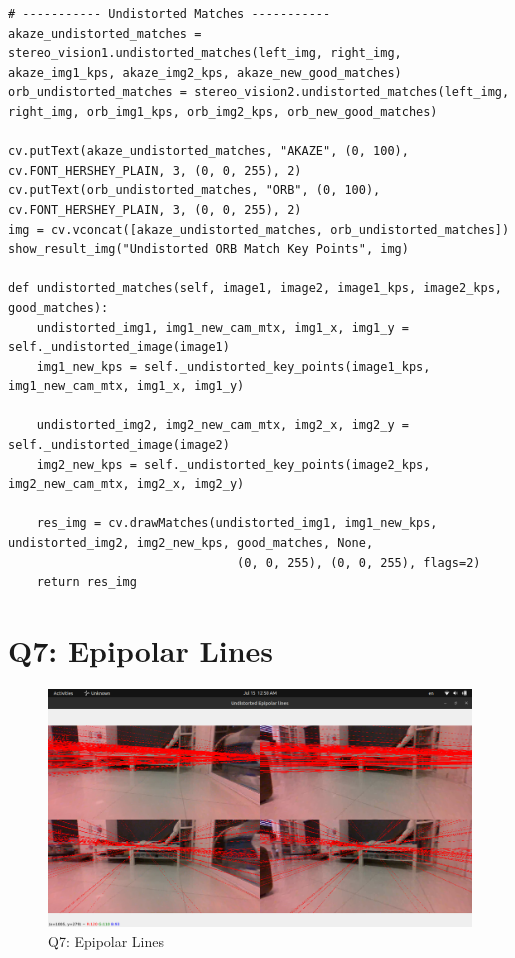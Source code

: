 \documentclass[a4paper, 12pt]{article}
\begin{document}
    \begin{lstlisting}
# ----------- Undistorted Matches -----------
akaze_undistorted_matches = stereo_vision1.undistorted_matches(left_img, right_img, akaze_img1_kps, akaze_img2_kps, akaze_new_good_matches)
orb_undistorted_matches = stereo_vision2.undistorted_matches(left_img, right_img, orb_img1_kps, orb_img2_kps, orb_new_good_matches)

cv.putText(akaze_undistorted_matches, "AKAZE", (0, 100), cv.FONT_HERSHEY_PLAIN, 3, (0, 0, 255), 2)
cv.putText(orb_undistorted_matches, "ORB", (0, 100), cv.FONT_HERSHEY_PLAIN, 3, (0, 0, 255), 2)
img = cv.vconcat([akaze_undistorted_matches, orb_undistorted_matches])
show_result_img("Undistorted ORB Match Key Points", img)

def undistorted_matches(self, image1, image2, image1_kps, image2_kps, good_matches):
    undistorted_img1, img1_new_cam_mtx, img1_x, img1_y = self._undistorted_image(image1)
    img1_new_kps = self._undistorted_key_points(image1_kps, img1_new_cam_mtx, img1_x, img1_y)

    undistorted_img2, img2_new_cam_mtx, img2_x, img2_y = self._undistorted_image(image2)
    img2_new_kps = self._undistorted_key_points(image2_kps, img2_new_cam_mtx, img2_x, img2_y)

    res_img = cv.drawMatches(undistorted_img1, img1_new_kps, undistorted_img2, img2_new_kps, good_matches, None,
                                (0, 0, 255), (0, 0, 255), flags=2)
    return res_img
    \end{lstlisting}

    \section{Q7: Epipolar Lines}
    
    \begin{figure}
		\caption{Q7: Epipolar Lines}
		\includegraphics[scale=0.25]{img/epipolar_lines.png}
	\end{figure}
\end{document}
